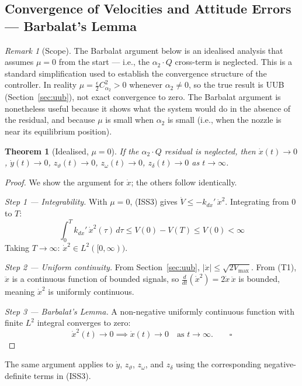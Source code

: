 \documentclass[11pt,a4paper]{article}
\theoremstyle{plain}
\newtheorem{theorem}{Theorem}[section]
\theoremstyle{remark}
\newtheorem{remark}{Remark}[section]
\newcommand{\vth}{\vartheta}
\newcommand{\zth}{z_{\vth}}
\newcommand{\zom}{z_{\omega}}
\newcommand{\zdel}{z_{\delta}}
\begin{document}
\subsection{Convergence of Velocities and Attitude Errors --- Barbalat's Lemma}
\label{sec:barbalat}

\begin{remark}[Scope]
The Barbalat argument below is an idealised analysis that assumes $\mu = 0$ from the start --- i.e., the $\alpha_2 \cdot Q$ cross-term is neglected. This is a standard simplification used to establish the convergence structure of the controller. In reality $\mu = \tfrac{\epsilon}{2}C_{\alpha_2}^2 > 0$ whenever $\alpha_2 \neq 0$, so the true result is UUB (Section~\ref{sec:uub}), not exact convergence to zero. The Barbalat argument is nonetheless useful because it shows what the system would do in the absence of the residual, and because $\mu$ is small when $\alpha_2$ is small (i.e., when the nozzle is near its equilibrium position).
\end{remark}

\begin{theorem}[Idealised, $\mu = 0$]
If the $\alpha_2 \cdot Q$ residual is neglected, then $\dot x(t) \to 0$, $\dot y(t) \to 0$, $\zth(t) \to 0$, $\zom(t) \to 0$, $\zdel(t) \to 0$ as $t \to \infty$.
\end{theorem}

\begin{proof}
We show the argument for $\dot x$; the others follow identically.

\textit{Step 1 --- Integrability.} With $\mu = 0$, (ISS3) gives $\dot V \leq -k_{dx}'\,\dot x^2$. Integrating from $0$ to $T$:
\[
  \int_0^T k_{dx}'\,\dot x^2(\tau)\,d\tau \leq V(0) - V(T) \leq V(0) < \infty
\]
Taking $T \to \infty$: $\dot x^2 \in L^2([0,\infty))$.

\textit{Step 2 --- Uniform continuity.} From Section~\ref{sec:uub}, $|\dot x| \leq \sqrt{2V_{\max}}$. From (T1), $\ddot x$ is a continuous function of bounded signals, so $\tfrac{d}{dt}(\dot x^2) = 2\dot x\,\ddot x$ is bounded, meaning $\dot x^2$ is uniformly continuous.

\textit{Step 3 --- Barbalat's Lemma.} A non-negative uniformly continuous function with finite $L^2$ integral converges to zero:
\[
  \dot x^2(t) \to 0 \implies \dot x(t) \to 0 \quad \text{as } t \to \infty. \qquad \square
\]
\end{proof}

The same argument applies to $\dot y$, $\zth$, $\zom$, and $\zdel$ using the corresponding negative-definite terms in (ISS3).
\end{document}
